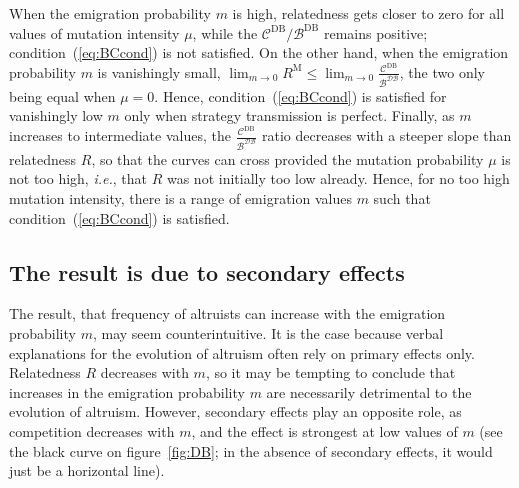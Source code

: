 \documentclass[11pt, letterpaper]{article}
\newcommand{\eqrefnoeq}[1]{(\ref{#1})}
\newcommand{\ie}{\textit{i.e.}}
\newcommand{\Esp}[1]{\mathbb{E}\big[ #1\big]}%
\newcommand{\Moran}{\textrm{M}}
\newcommand{\DB}{\textrm{DB}}
\newcommand{\mutbias}{\nu}
\begin{document}
When the emigration probability $m$ is high, relatedness gets closer to zero for all values of mutation intensity $\mu$, while the $\mathcal{C}^{\DB}/\mathcal{B}^{\DB}$ remains positive; condition~\eqrefnoeq{eq:BCcond} is not satisfied. On the other hand, when the emigration probability $m$ is vanishingly small, $\lim_{m\to 0} R^{\Moran} \leq \lim_{m\to 0} \frac{\mathcal{C}^{\DB}}{\mathcal{B^{\DB}}}$, the two only being equal when $\mu=0$. Hence, condition~\eqrefnoeq{eq:BCcond} is satisfied for vanishingly low $m$ only when strategy transmission is perfect. Finally, as $m$ increases to intermediate values, the $\frac{\mathcal{C}^{\DB}}{\mathcal{B^{\DB}}}$ ratio decreases with a steeper slope than relatedness $R$, so that the curves can cross provided the mutation probability $\mu$ is not too high, \ie, that $R$ was not initially too low already. Hence, for no too high mutation intensity,  there is a range of emigration values $m$ such that condition~\eqrefnoeq{eq:BCcond} is satisfied.



\subsection*{The result is due to secondary effects}
The result, that frequency of altruists can increase with the emigration probability $m$, may seem counterintuitive. It is the case because verbal explanations for the evolution of altruism often rely on primary effects only. Relatedness $R$ decreases with $m$, so it may be tempting to conclude that increases in the emigration probability $m$ are necessarily detrimental to the evolution of altruism. However, secondary effects play an opposite role, as competition decreases with $m$, and the effect is strongest at low values of $m$ (see the black curve on figure~\ref{fig:DB}; in the absence of secondary effects, it would just be a horizontal line). %
\end{document}
